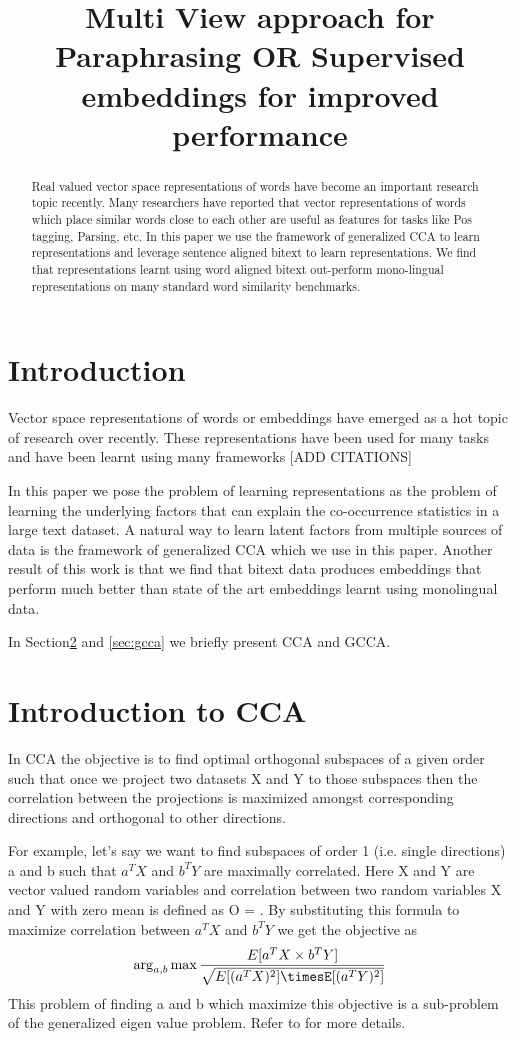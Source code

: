 \documentclass[11pt]{article}
\title{Multi View approach for Paraphrasing OR Supervised embeddings
  for improved performance}
\date{}
\begin{document}
\maketitle
\begin{abstract}
  Real valued vector space representations of words have become an
  important research topic recently. Many researchers have reported
  that vector representations of words which place similar words close
  to each other are useful as features for tasks like Pos tagging,
  Parsing, etc. In this paper we use the framework of generalized CCA
  to learn representations and leverage sentence aligned bitext to
  learn representations. We find that representations learnt using
  word aligned bitext out-perform mono-lingual representations on many
  standard word similarity benchmarks.
\end{abstract}

\section{Introduction}
Vector space representations of words or embeddings have emerged as a
hot topic of research over recently. These representations have been
used for many tasks and have been learnt using many frameworks [ADD
  CITATIONS]

In this paper we pose the problem of learning representations as the
problem of learning the underlying factors that can explain the
co-occurrence statistics in a large text dataset. A natural
way to learn latent factors from multiple sources of data is the
framework of generalized CCA which we use in this paper. Another
result of this work is that we find that bitext data produces
embeddings that perform much better than state of the art embeddings
learnt using monolingual data.

In Section\ref{sec:cca} and \ref{sec:gcca} we briefly present
 CCA and GCCA. 

\section{Introduction to CCA}
\label{sec:cca}
In CCA the objective is to find optimal orthogonal subspaces of a given order such that once we
project two datasets X and Y to those subspaces then the correlation
between the projections is maximized amongst corresponding directions
and orthogonal to other directions.

For example, let's say we want to find subspaces of order 1
(i.e. single directions) a and b such that $a^TX$ and $b^TY$ are
maximally correlated. Here X and Y are vector valued random variables
and correlation between two random variables X and Y with zero mean is defined as
O = . By substituting this
formula to maximize correlation between $a^TX$ and $b^TY$ we get the objective as
$$\arg_{a,b}\max \frac{E[a^TX \times
    b^TY]}{\sqrt{E[(a^TX)^2]\timesE[(a^TY)^2]}}$$
This problem of finding  a and b which maximize this objective is a
sub-problem of the generalized eigen value problem. Refer to
\cite{borga2001canonical} for more details.
\end{document}
